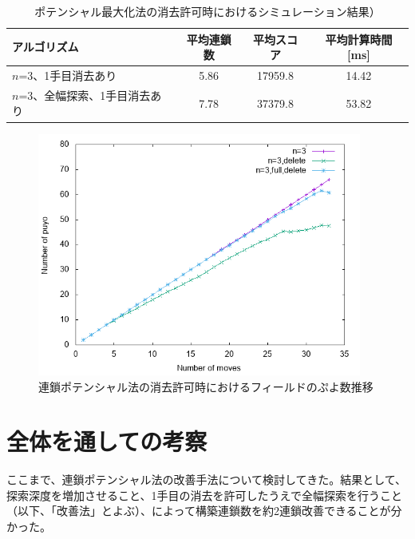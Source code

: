\documentclass[12pt]{jreport}
\begin{document}
\begin{table}[tb]
\begin{center}
\caption{ポテンシャル最大化法の消去許可時におけるシミュレーション結果）} \label{tab:poten_del}
  \begin{tabular}{|l|c|c|c|} \hline
アルゴリズム & 平均連鎖数 & 平均スコア & 平均計算時間[ms]\\ \hline
$n$=3、1手目消去あり & 5.86 & 17959.8 & 14.42\\ \hline
$n$=3、全幅探索、1手目消去あり & 7.78 & 37379.8 & 53.82\\ \hline
\end{tabular}
\end{center}
\end{table}


\begin{figure}[tb]
  \begin{center}
  \includegraphics[height=8cm]{graph/Potential/totalPuyo_N3_N3del_N3fulldel.png}
  \caption{連鎖ポテンシャル法の消去許可時におけるフィールドのぷよ数推移} \label{fig:poten_totalPuyo_del}
\end{center}
\end{figure}



\section{全体を通しての考察}
ここまで、連鎖ポテンシャル法の改善手法について検討してきた。結果として、探索深度を増加させること、1手目の消去を許可したうえで全幅探索を行うこと（以下、「改善法」とよぶ）、によって構築連鎖数を約2連鎖改善できることが分かった。
\end{document}
